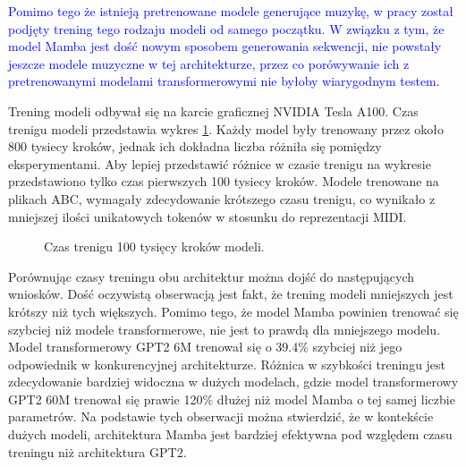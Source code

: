 \documentclass[data-science]{agh-wi} %
\begin{document}
\textcolor{blue}{Pomimo tego że istnieją pretrenowane modele generujące muzykę, w pracy został podjęty trening tego rodzaju modeli od samego początku. W związku z tym, że model Mamba jest dość nowym sposobem generowania sekwencji, nie powstały jeszcze modele muzyczne w tej architekturze, przez co porówywanie ich z pretrenowanymi modelami transformerowymi nie byłoby wiarygodnym testem.}

Trening modeli odbywał się na karcie graficznej NVIDIA Tesla A100. Czas trenigu modeli przedstawia wykres \ref*{fig:czas_treningu}. Każdy model były trenowany przez około 800 tysiecy kroków, jednak ich dokładna liczba różniła się pomiędzy eksperymentami. Aby lepiej przedstawić różnice w czasie trenigu na wykresie przedstawiono tylko czas pierwszych 100 tysiecy kroków. Modele trenowane na plikach ABC, wymagały zdecydowanie krótszego czasu trenigu, co wynikało z mniejszej ilości unikatowych tokenów w stosunku do reprezentacji MIDI.

\begin{figure}[ht!]
    \centering
    \caption{Czas trenigu 100 tysięcy kroków modeli.}\label{fig:czas_treningu}
\end{figure}

Porównując czasy treningu obu architektur można dojść do następujących wniosków. Dość oczywistą obserwacją jest fakt, że trening modeli mniejszych jest krótszy niż tych większych. Pomimo tego, że model Mamba powinien trenować się szybciej niż modele transformerowe, nie jest to prawdą dla mniejszego modelu. Model transformerowy GPT2 6M trenował się o 39.4\% szybciej niż jego odpowiednik w konkurencyjnej architekturze. Różnica w szybkości treningu jest zdecydowanie bardziej widoczna w dużych modelach, gdzie model transformerowy GPT2 60M trenował się prawie 120\% dłużej niż model Mamba o tej samej liczbie parametrów. Na podstawie tych obserwacji można stwierdzić, że w kontekście dużych modeli, architektura Mamba jest bardziej efektywna pod względem czasu treningu niż architektura GPT2.
\end{document}
